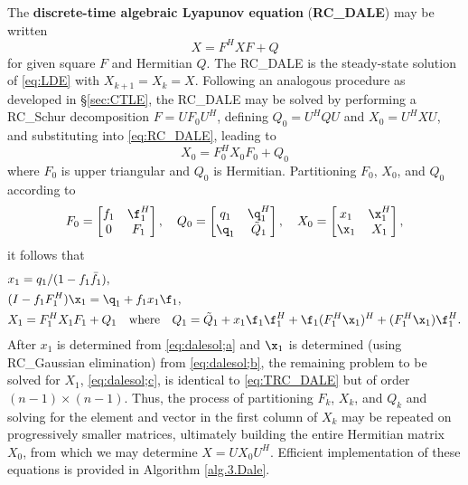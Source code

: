 The {\bf discrete-time algebraic Lyapunov equation} ({\bf RC_DALE}) may be written
\begin{equation}
X = F^H X F + Q
\label{eq:RC_DALE}
\end{equation}
for given square $F$ and Hermitian $Q$.  The RC_DALE is the steady-state solution of \eqref{eq:LDE} with $X_{k+1}=X_k=X$.
Following an analogous procedure as developed in \S \ref{sec:CTLE}, the RC_DALE may be solved by performing a RC_Schur decomposition $F=U F_0 U^{H}$,
defining $Q_0=U^H Q U$ and $X_0=U^H X U$, and substituting into \eqref{eq:RC_DALE}, leading to 
\begin{equation}
X_0 = F_0^H X_0 F_0 + Q_0
\label{eq:TRC_DALE}
\end{equation}
where $F_0$ is upper triangular and $Q_0$ is Hermitian.  Partitioning $F_0$, $X_0$, and $Q_0$ according to
\begin{equation*}
   F_0=\begin{bmatrix} f_1 & \f_1^H \\ 0 & F_1 \end{bmatrix}, \quad
   Q_0=\begin{bmatrix} q_1 & \q_1^H \\ \q_1 & \tilde Q_1 \end{bmatrix}, \quad
   X_0=\begin{bmatrix} x_1 & \x_1^H \\ \x_1 & X_1 \end{bmatrix},
\end{equation*}
it follows that
\begin{subequations}
\label{eq:dalesol}
\begin{align}
 &x_1 = q_1 / (1-f_1 \bar f_1),     \label{eq:dalesol;a} \\
 &(I - f_1 F_1^H) \x_1 = \q_1 + f_1 x_1 \f_1, \label{eq:dalesol;b}\\
 &X_1 = F_1^H X_1 F_1 + Q_1 \quad \textrm{where} \quad Q_1 = \tilde Q_1 + x_1 \f_1 \f_1^H + \f_1 (F_1^H \x_1)^H + (F_1^H \x_1) \f_1^H.  \label{eq:dalesol;c}
\end{align}
\end{subequations}
After $x_1$ is determined from \eqref{eq:dalesol;a} and $\x_1$ is determined (using RC_Gaussian elimination) from \eqref{eq:dalesol;b},
the remaining problem to be solved for $X_1$, \eqref{eq:dalesol;c}, is identical to \eqref{eq:TRC_DALE} but of order $(n-1)\times (n-1)$.  
Thus, the process of partitioning $F_k$, $X_k$, and $Q_k$ and solving for the element and vector in the first
column of $X_k$ may be repeated on progressively smaller matrices, ultimately building
the entire Hermitian matrix $X_0$, from which we may determine $X = U X_0 U^H$.  Efficient implementation of these equations
is provided in Algorithm \ref{alg.3.Dale}.

